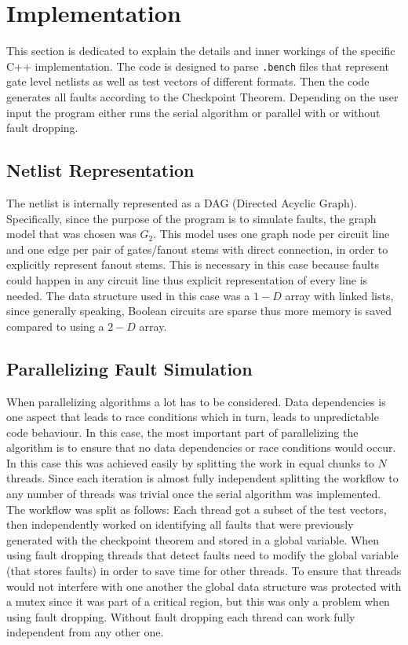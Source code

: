 \documentclass[a4paper,11pt]{article}
\begin{document}
\clearpage

\section*{Implementation}
This section is dedicated to explain the details and inner workings of the specific C++ implementation. The code is designed to parse \texttt{.bench} files that represent gate level netlists as well as test vectors of different formats. Then the code generates all faults according to the Checkpoint Theorem. Depending on the user input the program either runs the serial algorithm or parallel with or without fault dropping.

\subsection*{Netlist Representation}
The netlist is internally represented as a DAG (Directed Acyclic Graph). Specifically, since the purpose of the program is to simulate faults, the graph model that was chosen was $G_2$. This model uses one graph node per circuit line and one edge per pair of gates/fanout stems with direct connection, in order to explicitly represent fanout stems. This is necessary in this case because faults could happen in any circuit line thus explicit representation of every line is needed. The data structure used in this case was a $1-D$ array with linked lists, since generally speaking, Boolean circuits are sparse thus more memory is saved compared to using a $2-D$ array. 

\subsection*{Parallelizing Fault Simulation}
When parallelizing algorithms a lot has to be considered. Data dependencies is one aspect that leads to race conditions which in turn, leads to unpredictable code behaviour. In this case, the most important part of parallelizing the algorithm is to ensure that no data dependencies or race conditions would occur. In this case this was achieved easily by splitting the work in equal chunks to $N$ threads. Since each iteration is almost fully independent splitting the workflow to any number of threads was trivial once the serial algorithm was implemented. The workflow was split as follows: Each thread got a subset of the test vectors, then independently worked on identifying all faults that were previously generated with the checkpoint theorem and stored in a global variable. When using fault dropping threads that detect faults need to modify the global variable (that stores faults) in order to save time for other threads. To ensure that threads would not interfere with one another the global data structure was protected with a mutex since it was part of a critical region, but this was only a problem when using fault dropping. Without fault dropping each thread can work fully independent from any other one.
\end{document}
